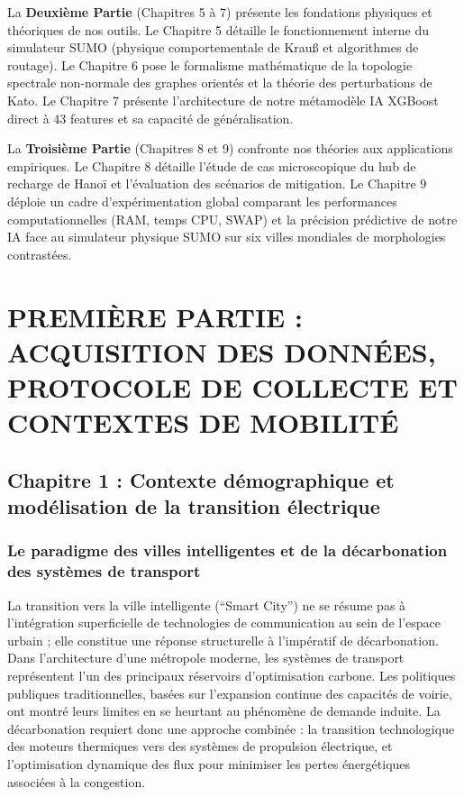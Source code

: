 \documentclass[10pt, a4paper]{article}
\begin{document}
La \textbf{Deuxième Partie} (Chapitres 5 à 7) présente les fondations
physiques et théoriques de nos outils. Le Chapitre 5 détaille le
fonctionnement interne du simulateur SUMO (physique comportementale de
Krauß et algorithmes de routage). Le Chapitre 6 pose le formalisme
mathématique de la topologie spectrale non-normale des graphes orientés
et la théorie des perturbations de Kato. Le Chapitre 7 présente
l'architecture de notre métamodèle IA XGBoost direct à 43 features et sa
capacité de généralisation.

La \textbf{Troisième Partie} (Chapitres 8 et 9) confronte nos théories
aux applications empiriques. Le Chapitre 8 détaille l'étude de cas
microscopique du hub de recharge de Hanoï et l'évaluation des scénarios
de mitigation. Le Chapitre 9 déploie un cadre d'expérimentation global
comparant les performances computationnelles (RAM, temps CPU, SWAP) et
la précision prédictive de notre IA face au simulateur physique SUMO sur
six villes mondiales de morphologies contrastées.

\newpage

\section{PREMIÈRE PARTIE : ACQUISITION DES DONNÉES, PROTOCOLE DE
COLLECTE ET CONTEXTES DE
MOBILITÉ}\label{premiuxe8re-partie-acquisition-des-donnuxe9es-protocole-de-collecte-et-contextes-de-mobilituxe9}

\subsection{Chapitre 1 : Contexte démographique et modélisation de la
transition
électrique}\label{chapitre-1-contexte-duxe9mographique-et-moduxe9lisation-de-la-transition-uxe9lectrique}

\subsubsection{Le paradigme des villes intelligentes et de la
décarbonation des systèmes de
transport}\label{le-paradigme-des-villes-intelligentes-et-de-la-duxe9carbonation-des-systuxe8mes-de-transport}

La transition vers la ville intelligente (``Smart City'') ne se résume
pas à l'intégration superficielle de technologies de communication au
sein de l'espace urbain ; elle constitue une réponse structurelle à
l'impératif de décarbonation. Dans l'architecture d'une métropole
moderne, les systèmes de transport représentent l'un des principaux
réservoirs d'optimisation carbone. Les politiques publiques
traditionnelles, basées sur l'expansion continue des capacités de
voirie, ont montré leurs limites en se heurtant au phénomène de demande
induite. La décarbonation requiert donc une approche combinée : la
transition technologique des moteurs thermiques vers des systèmes de
propulsion électrique, et l'optimisation dynamique des flux pour
minimiser les pertes énergétiques associées à la congestion.
\end{document}
